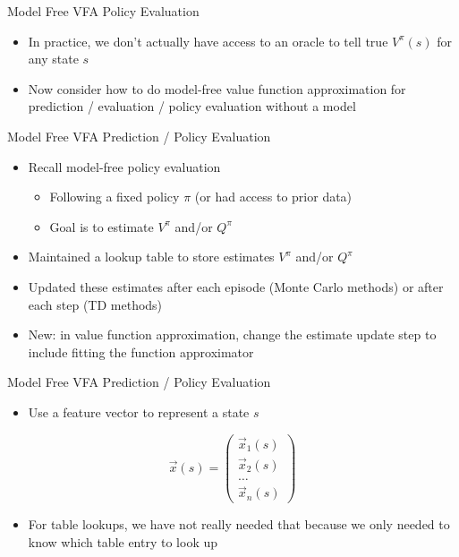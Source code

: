 \begin{frame}[c]{Model Free VFA Policy Evaluation}
	
	
	\begin{itemize}
		\item In practice, we don’t actually have access to an oracle to tell true $V^\pi(s)$ for any
		state $s$
		\item Now consider how to do model-free value function approximation for
		prediction / evaluation / policy evaluation without a model
	\end{itemize}
	
\end{frame}
\begin{frame}[c]{Model Free VFA Prediction / Policy Evaluation}
	
	
	\begin{itemize}
		\item Recall model-free policy evaluation
		\begin{itemize}
			\item Following a fixed policy $\pi$ (or had access to prior data)
			\item Goal is to estimate $V^\pi$ and/or $Q^\pi$
		\end{itemize}
		\item Maintained a lookup table to store estimates $V^\pi$ and/or $Q^\pi$
		\item Updated these estimates after each episode (Monte Carlo methods)
		or after each step (TD methods)
		\item New: in value function approximation, change the estimate
		update step to include fitting the function approximator
	\end{itemize}
	
\end{frame}
\begin{frame}[c]{Model Free VFA Prediction / Policy Evaluation}
	
	
	\begin{itemize}
		\item Use a feature vector to represent a state $s$
	\end{itemize}

$$\vec{x}(s) = \begin{pmatrix}
\vec{x}_1(s)\\
\vec{x}_2(s)\\
\ldots\\
\vec{x}_n(s)
\end{pmatrix} $$

\begin{itemize}
	\item For table lookups, we have not really needed that because we only needed to know which table entry to look up
\end{itemize}
	
\end{frame}
